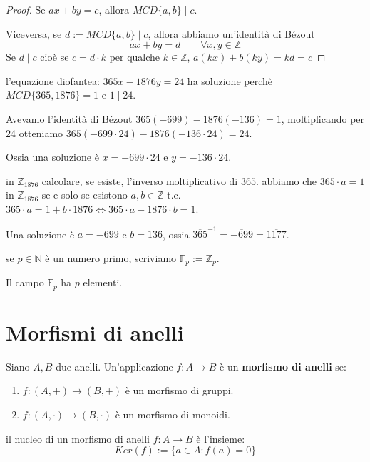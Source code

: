 \documentclass[../main.tex]{subfiles}
\begin{document}
\begin{proof}
    Se $ax + by = c$, allora $MCD \{a,b\} \mid c$.

    Viceversa, se $d := MCD \{a,b\} \mid c$, allora abbiamo un'identità di Bézout
    \begin{equation*}
        ax + by = d \qquad \forall x,y \in \mathbb{Z}
    \end{equation*}
    Se $d \mid c$ cioè se $c = d \cdot k$ per qualche $k \in \mathbb{Z} $, $a(kx) + b(ky) = kd = c$
\end{proof}

\begin{example}
    l'equazione diofantea: $365x - 1876y = 24$ ha soluzione perchè $MCD \{365,1876\} = 1$ e $1 \mid 24$.

    Avevamo l'identità di Bézout $365(-699) - 1876(-136) = 1$, moltiplicando per 24 otteniamo $365(-699 \cdot 24) - 1876(-136 \cdot 24) = 24$.

    Ossia una soluzione è $x = -699 \cdot 24$ e $y = -136 \cdot 24$.
\end{example}

\begin{example}
    in $\mathbb{Z}_{1876}$ calcolare, se esiste, l'inverso moltiplicativo di $\overline{365}$. abbiamo che $\overline{365} \cdot \overline{a} = \overline{1}$ in $\mathbb{Z}_{1876}$ se e solo se esistono $a,b \in \mathbb{Z}$ t.c. $365 \cdot a = 1 + b \cdot 1876 \iff 365 \cdot a - 1876 \cdot b = 1$.

    Una soluzione è $a = -699$ e $b = 136$, ossia $\overline{365}^{-1} = \overline{-699} = \overline{1177}$.
\end{example}

\begin{remark}
    se $p \in \mathbb{N}$ è un numero primo, scriviamo $\mathbb{F}_p := \mathbb{Z}_p$.

    Il campo $\mathbb{F}_p$ ha $p$ elementi.
\end{remark}

\section{Morfismi di anelli}

\begin{definition}
    Siano $A,B$ due anelli. Un'applicazione $f : A \rightarrow B$ è un \textbf{morfismo di anelli} se:
    \begin{enumerate}[label=(\roman*)]
        \item $f: (A,+) \rightarrow (B,+)$ è un morfismo di gruppi.
        \item $f: (A,\cdot) \rightarrow (B,\cdot)$ è un morfismo di monoidi.
    \end{enumerate}
\end{definition}

\begin{definition}
    il nucleo di un morfismo di anelli $f : A \rightarrow B$ è l'insieme:
    \begin{equation*}
        Ker(f):=\{a \in A : f(a) = 0\}
    \end{equation*}
\end{definition}
\end{document}
